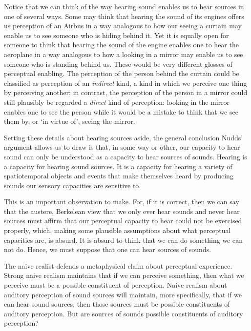\documentclass[sloppy, journal, git, bytitle, dodraft]{humapap}
\begin{document}
Notice that we can think of the way hearing sound enables us to hear sources in one of several ways. Some may think that hearing the sound of its engines offers us perception of an Airbus in a way analogous to how our seeing a curtain may enable us to see someone who is hiding behind it. Yet it is equally open for someone to think that hearing the sound of the engine enables one to hear the aeroplane in a way analogous to how a looking in a mirror may enable us to see someone who is standing behind us. These would be very different glosses of perceptual enabling. The perception of the person behind the curtain could be classified as perception of an \emph{indirect} kind, a kind in which we perceive one thing by perceiving another; in contrast, the perception of the person in a mirror could still plausibly be regarded a \emph{direct} kind of perception: looking in the mirror enables one to see the person while it would be a mistake to think that we see them by, or `in virtue of', seeing the mirror. 

Setting these details about hearing sources aside, the general conclusion Nudds' argument allows us to draw is that, in some way or other,  our capacity to hear sound can only be understood as a capacity to hear sources of sounds. Hearing is a capacity for hearing sound sources. It is a capacity for hearing a variety of spatiotemporal objects and events that make themselves heard by producing sounds our sensory capacities are sensitive to. 

This is an important observation to make. For, if it is correct, then we can say that the austere, Berkelean view that we only ever hear sounds and never hear sources must affirm that our perceptual capacity to hear could not be exercised properly, which, making some plausible assumptions about what perceptual capacities are, is absurd. It is absurd to think that we can do something we can not do. Hence, we must suppose that one can hear sources of sounds.

\sect   The naive realist defends a metaphysical claim about perceptual experience. Strong naive realism maintains that if we can perceive something, then what we perceive must be a possible constituent of perception. Naive realism about auditory perception of sound sources will maintain, more specifically, that if we can hear sound sources, then those sources must be possible constituents of auditory perception. But are sources of sounds possible constituents of auditory perception?
\end{document}
